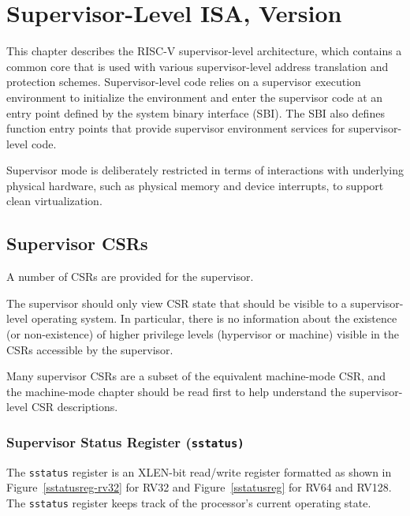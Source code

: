 \chapter{Supervisor-Level ISA, Version \privrev}
\label{supervisor}

This chapter describes the RISC-V supervisor-level architecture, which
contains a common core that is used with various supervisor-level
address translation and protection schemes.
Supervisor-level code relies on a supervisor execution environment to
initialize the environment and enter the supervisor code at an entry
point defined by the system binary interface (SBI).  The SBI also
defines function entry points that provide supervisor environment
services for supervisor-level code.

\begin{commentary}
Supervisor mode is deliberately restricted in terms of interactions
with underlying physical hardware, such as physical memory and device
interrupts, to support clean virtualization.
\end{commentary}

\section{Supervisor CSRs}

A number of CSRs are provided for the supervisor.

\begin{commentary}
The supervisor should only view CSR state that should be visible to a
supervisor-level operating system.  In particular, there is no
information about the existence (or non-existence) of higher privilege
levels (hypervisor or machine) visible in the CSRs accessible by the
supervisor.

Many supervisor CSRs are a subset of the equivalent machine-mode CSR,
and the machine-mode chapter should be read first to help understand
the supervisor-level CSR descriptions.
\end{commentary}

\subsection{Supervisor Status Register (\tt sstatus)}
\label{sstatus}


The {\tt sstatus} register is an XLEN-bit read/write register
formatted as shown in Figure~\ref{sstatusreg-rv32} for RV32 and
Figure~\ref{sstatusreg} for RV64 and RV128.  The {\tt sstatus}
register keeps track of the processor's current operating state.

